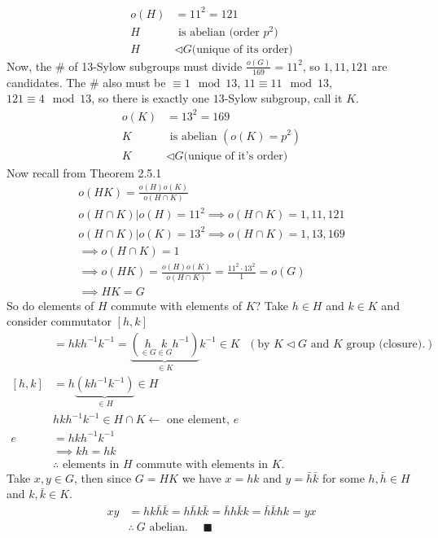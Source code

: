 \begin{enumerate}
    \begin{align}
        o(H)&=11^2=121 \nonumber \\
        H &\text{ is abelian (order }p^2) \nonumber \\
        H&\triangleleft G \text{(unique of its order)} \nonumber
    \end{align}
    Now, the \# of 13-Sylow subgroups must divide $\frac{o(G)}{169}=11^2$, so $1, 11, 121$ are
    candidates. The \# also must be $\equiv 1 \mod 13$, $11\equiv 11\mod 13$,
    $121 \equiv 4 \mod 13$, so there is exactly one $13$-Sylow subgroup, call it $K$.
    \begin{align}
        o(K)&=13^2=169\nonumber \\
        K &\text{ is abelian }(o(K)=p^2) \nonumber \\
        K&\triangleleft G  \text{(unique of it's order)} \nonumber
    \end{align}
    Now recall from Theorem 2.5.1
    \begin{align}
        o(HK)= \frac{o(H)o(K)}{o(H\cap K)} \nonumber \\
        o(H\cap K) | o(H)=11^2 \implies o(H\cap K) = 1, 11, 121 \nonumber \\
        o(H\cap K) | o(K)=13^2 \implies o(H\cap K) = 1, 13, 169 \nonumber \\
        \implies  o(H\cap K) = 1 \nonumber \\
        \implies o(HK) = \frac{o(H)o(K)}{o(H\cap K)}= \frac{11^2\cdot 13^2}{1} = o(G) \nonumber \\
        \implies HK = G \nonumber
    \end{align}
    So do elements of $H$ commute with elements of $K$? Take $h\in H$ and $k\in K$ and consider
    commutator $[h,k]$
    \begin{align}
        [h,k] &= hkh^{-1}k^{-1} = \underbrace{(\underset{\in G}{h}\underset{\in G}{k}h^{-1})}_{\in K}k^{-1} \in K  \ \ \  (\text{by } K\triangleleft G \text{ and } K \text{ group (closure)}.) \nonumber \\
        [h,k] &= h\underbrace{(kh^{-1}k^{-1})}_{\in H} \in H \nonumber \\
        &hkh^{-1}k^{-1} \in H\cap K \leftarrow \text{ one element, }e \nonumber \\
        e&= hkh^{-1}k^{-1} \nonumber \\
        &\implies kh=hk \nonumber \\
        &\therefore \text{ elements in }H \text{ commute with elements in }K. \nonumber
    \end{align}
    Take $x,y \in G$, then since $G=HK$ we have $x=hk$ and $y=\bar{h}\bar{k}$ for some
    $h,\bar{h}\in H$ and $k,\bar{k}\in K$.
    \begin{align}
        xy&=hk\bar{h}\bar{k}=h\bar{h}k\bar{k}=\bar{h}h\bar{k}k=\bar{h}\bar{k}hk=yx \nonumber \\
        &\therefore \ G \text{ abelian}. \ \ \ \ \ \ \blacksquare \nonumber
    \end{align}
\end{enumerate}
